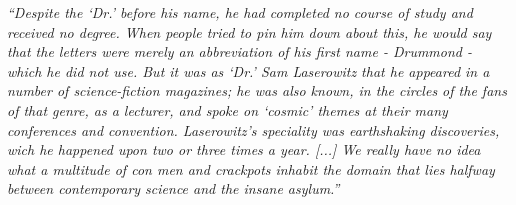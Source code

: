 

\clearpage

\normalsize

\vspace*{\fill}


\noindent \textit{``Despite the `Dr.' before his name, he had completed no course of study and received no degree. When people tried to pin him down about this, he would say that the letters were merely an abbreviation of his first name - Drummond - which he did not use. But it was as `Dr.' Sam Laserowitz that he appeared in a number of science-fiction magazines; he was also known, in the circles of the fans of that genre, as a lecturer, and spoke on `cosmic' themes at their many conferences and convention. Laserowitz's speciality was earthshaking discoveries, wich he happened upon two or three times a year. [...] We really have no idea what a multitude of con men and crackpots inhabit the domain that lies halfway between contemporary science and the insane asylum.''}
\vspace{\baselineskip}

